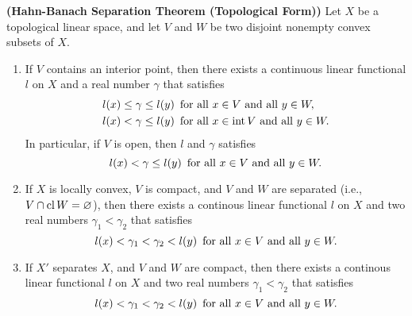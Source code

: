\begin{theorem}{\bf (Hahn-Banach Separation Theorem (Topological Form))}
  Let $X$ be a topological linear space, and let $V$ and $W$ be two disjoint nonempty convex subsets of $X$.
  \begin{enumerate}
    \item If $V$ contains an interior point, then there exists a continuous linear functional $l$ on $X$ and a real number $\gamma$ that satisfies
    \begin{equation*}
      \begin{aligned}
        l(x)\leq\gamma\leq l(y)&\text{\enskip for all }x\in V\text{ and all }y\in W,\\
        l(x)<\gamma\leq l(y)&\text{\enskip for all }x\in \operatorname{int} V\text{ and all }y\in W.
      \end{aligned}
    \end{equation*}
    In particular, if $V$ is open, then $l$ and $\gamma$ satisfies
    \begin{equation*}
      l(x)<\gamma\leq l(y)\text{\enskip for all }x\in V\text{ and all }y\in W.
    \end{equation*}
    \item If $X$ is locally convex, $V$ is compact, and $V$ and $W$ are separated (i.e., $V\cap \operatorname{cl} W=\varnothing$), then there exists a continous linear functional $l$ on $X$ and two real numbers $\gamma_1<\gamma_2$ that satisfies
    \begin{equation*}
      l(x)<\gamma_1<\gamma_2 < l(y)\text{\enskip for all }x\in V\text{ and all }y\in W.
    \end{equation*}
    \item If $X'$ separates $X$, and $V$ and $W$ are compact, then there exists a continous linear functional $l$ on $X$ and two real numbers $\gamma_1<\gamma_2$ that satisfies
    \begin{equation*}
      l(x)<\gamma_1<\gamma_2 < l(y)\text{\enskip for all }x\in V\text{ and all }y\in W.
    \end{equation*}
  \end{enumerate}
\end{theorem}

